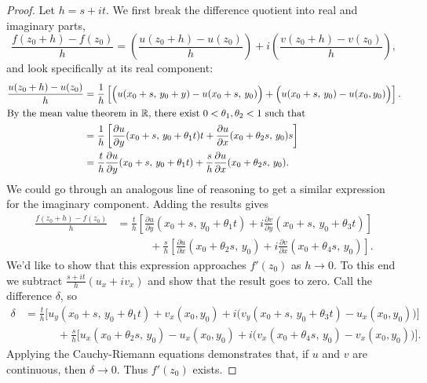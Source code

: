 \documentclass[../m136main.tex]{subfiles}
\begin{document}
\begin{proof}
    Let $h = s + it$.
    We first break the difference quotient into real and imaginary parts,
    \[ \frac{f(z_0 + h) - f(z_0)}{h} = \left( \frac{u(z_0 + h) - u(z_0)}{h} \right) + i \left( \frac{v(z_0 + h) - v(z_0)}{h} \right), \]
    and look specifically at its real component:
    \begin{align*}
        \frac{u(z_0 + h) - u(z_0)}{h} &= \frac{1}{h} \left[ \Big( u(x_0 + s, \, y_0 + y) - u(x_0 + s, \, y_0) \Big) + \Big( u(x_0 + s, \, y_0) - u(x_0, y_0) \Big) \right]. \\
        \intertext{By the mean value theorem in $\mathbb{R}$, there exist $0 < \theta_1, \theta_2 < 1$ such that}
        &= \frac{1}{h} \left[ \frac{\partial u}{\partial y} (x_0 + s, \, y_0 + \theta_1 t)t + \frac{\partial u}{\partial x} (x_0 + \theta_2 s, \, y_0)s \right] \\
        &= \frac{t}{h} \frac{\partial u}{\partial y} (x_0 + s, \, y_0 + \theta_1 t) + \frac{s}{h} \frac{\partial u}{\partial x} (x_0 + \theta_2 s, \, y_0).
    \end{align*}
    We could go through an analogous line of reasoning to get a similar expression for the imaginary component.
    Adding the results gives
    \begin{align*}
        \frac{f(z_0 + h) - f(z_0)}{h} &= \frac{t}{h} \left[ \frac{\partial u}{\partial y} (x_0 + s, \, y_0 + \theta_1 t) + i \frac{\partial v}{\partial y} (x_0 + s, \, y_0 + \theta_3 t) \right] \\
        &\qquad\quad + \frac{s}{h} \left[ \frac{\partial u}{\partial x} (x_0 + \theta_2 s, \, y_0) + i \frac{\partial v}{\partial x} (x_0 + \theta_4 s, \, y_0) \right].
    \end{align*}
    We'd like to show that this expression approaches $f'(z_0)$ as $h \to 0$.
    To this end we subtract $\frac{s + it}{h} (u_x + i v_x)$ and show that the result goes to zero.
    Call the difference $\delta$, so
    \begin{align*}
        \delta &= \frac{t}{h} \Big[ u_y (x_0 + s, \, y_0 + \theta_1 t) + v_x(x_0, y_0) + i \Big( v_y(x_0 + s, \, y_0 + \theta_3 t) - u_x(x_0, y_0) \Big) \Big] \\
        &\qquad\quad + \frac{s}{h} \Big[ u_x(x_0 + \theta_2 s, \, y_0) - u_x(x_0, y_0) + i \Big( v_x(x_0 + \theta_4 s, \, y_0) - v_x(x_0, y_0) \Big) \Big].
    \end{align*}
    Applying the Cauchy-Riemann equations demonstrates that, if $u$ and $v$ are continuous, then $\delta \to 0$.
    Thus $f'(z_0)$ exists.
\end{proof}
\end{document}
